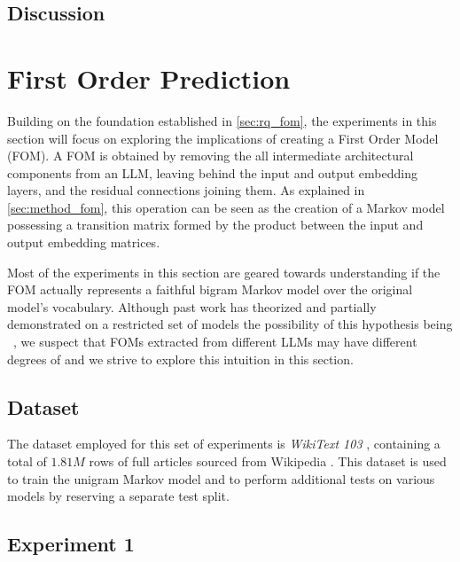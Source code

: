 \subsection{Discussion}


\section{First Order Prediction}

Building on the foundation established in \cref{sec:rq_fom}, the experiments in this section will focus on exploring the implications of creating a First Order Model (FOM).
A FOM is obtained by removing the all intermediate architectural components from an LLM, leaving behind the input and output embedding layers, and the residual connections joining them.
As explained in \cref{sec:method_fom}, this operation can be seen as the creation of a Markov model possessing a transition matrix formed by the product between the input and output embedding matrices.

Most of the experiments in this section are geared towards understanding if the FOM actually represents a faithful bigram Markov model over the original model's vocabulary.
Although past work has theorized and partially demonstrated on a restricted set of models the possibility of this hypothesis being ~\cite{elhage2021}, we suspect that FOMs extracted from different LLMs may have different degrees of  and we strive to explore this intuition in this section.

\subsection{Dataset}

The dataset employed for this set of experiments is \emph{WikiText 103} , containing a total of $1.81M$ rows of full articles sourced from Wikipedia .
This dataset is used to train the unigram Markov model and to perform additional tests on various models by reserving a separate test split.

\subsection{Experiment 1}

